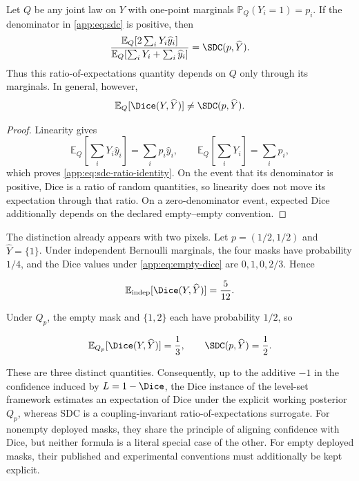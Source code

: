 \begin{proposition}
\label{app:prop:sdc-ratio}
Let $Q$ be any joint law on $Y$ with one-point marginals
$\mathbb{P}_Q(Y_i=1)=p_i$.  If the denominator in
\eqref{app:eq:sdc} is positive, then
\begin{equation}
  \frac{
    \mathbb{E}_Q[2\sum_iY_i\widehat y_i]
  }{
    \mathbb{E}_Q[\sum_iY_i+\sum_i\widehat y_i]
  }
  =\SDC(p,\widehat Y).
  \label{app:eq:sdc-ratio-identity}
\end{equation}
Thus this ratio-of-expectations quantity depends on $Q$ only through its
marginals.  In general, however,
\begin{equation}
  \mathbb{E}_Q[\Dice(Y,\widehat Y)]
  \neq \SDC(p,\widehat Y).
  \label{app:eq:sdc-not-expected-dice}
\end{equation}
\end{proposition}

\begin{proof}
Linearity gives
\begin{equation}
  \mathbb{E}_Q\!\left[\sum_iY_i\widehat y_i\right]
  =\sum_i p_i\widehat y_i,
  \qquad
  \mathbb{E}_Q\!\left[\sum_iY_i\right]=\sum_i p_i,
\end{equation}
which proves \eqref{app:eq:sdc-ratio-identity}. On the event that its
denominator is positive, Dice is a ratio of random quantities, so linearity
does not move its expectation through that ratio. On a zero-denominator event,
expected Dice additionally depends on the declared empty--empty convention.
\end{proof}

The distinction already appears with two pixels.  Let
$p=(1/2,1/2)$ and $\widehat Y=\{1\}$.  Under independent Bernoulli
marginals, the four masks have probability $1/4$, and the Dice values
under \eqref{app:eq:empty-dice} are $0,1,0,2/3$.  Hence

\begin{equation}
  \mathbb{E}_{\mathrm{indep}}[
    \Dice(Y,\widehat Y)]=\frac5{12}.
\end{equation}

Under $Q_p$, the empty mask and $\{1,2\}$ each have probability $1/2$,
so

\begin{equation}
  \mathbb{E}_{Q_p}[\Dice(Y,\widehat Y)]=\frac13,
  \qquad
  \SDC(p,\widehat Y)=\frac12.
  \label{app:eq:sdc-counterexample}
\end{equation}

These are three distinct quantities.  Consequently, up to the additive
$-1$ in the confidence induced by $L=1-\Dice$, the Dice instance of the
level-set framework estimates an expectation of Dice under the explicit
working posterior $Q_p$, whereas SDC is a coupling-invariant
ratio-of-expectations surrogate. For nonempty deployed masks, they share the
principle of aligning confidence with Dice, but neither formula is a literal
special case of the other. For empty deployed masks, their published and
experimental conventions must additionally be kept explicit.
